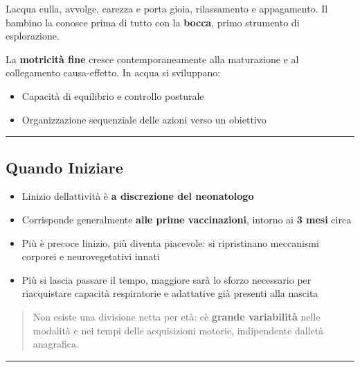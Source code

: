 \documentclass[a4paper,11pt]{article}
\providecommand{\tightlist}{%
  \setlength{\itemsep}{0pt}\setlength{\parskip}{0pt}}
\begin{document}
L\textquotesingle acqua culla, avvolge, carezza e porta gioia,
rilassamento e appagamento. Il bambino la conosce prima di tutto con la
\textbf{bocca}, primo strumento di esplorazione.

La \textbf{motricità fine} cresce contemporaneamente alla maturazione e
al collegamento causa-effetto. In acqua si sviluppano:

\begin{itemize}
      \tightlist
      \item
            Capacità di equilibrio e controllo posturale
      \item
            Organizzazione sequenziale delle azioni verso un obiettivo
\end{itemize}

\begin{center}\rule{0.5\linewidth}{0.5pt}\end{center}

\subsection{Quando Iniziare}\label{quando-iniziare}

\begin{itemize}
      \tightlist
      \item
            L\textquotesingle inizio dell\textquotesingle attività è \textbf{a
                  discrezione del neonatologo}
      \item
            Corrisponde generalmente \textbf{alle prime vaccinazioni}, intorno ai
            \textbf{3 mesi} circa
      \item
            Più è precoce l\textquotesingle inizio, più diventa piacevole: si
            ripristinano meccanismi corporei e neurovegetativi innati
      \item
            Più si lascia passare il tempo, maggiore sarà lo sforzo necessario per
            riacquistare capacità respiratorie e adattative già presenti alla
            nascita
\end{itemize}

\begin{quote}
      Non esiste una divisione netta per età: c\textquotesingle è
      \textbf{grande variabilità} nelle modalità e nei tempi delle
      acquisizioni motorie, indipendente dall\textquotesingle età anagrafica.
\end{quote}

\begin{center}\rule{0.5\linewidth}{0.5pt}\end{center}
\end{document}

